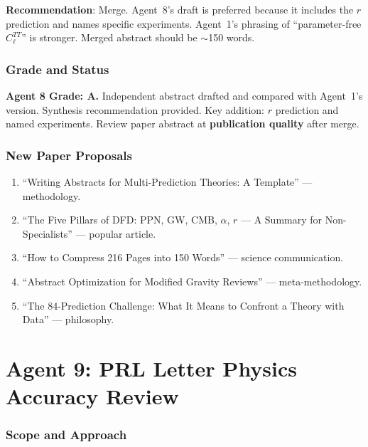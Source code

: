 \documentclass[11pt,a4paper]{article}
\begin{document}
\textbf{Recommendation}: Merge. Agent~8's draft is preferred because it includes the $r$ prediction and names specific experiments. Agent~1's phrasing of ``parameter-free $C_\ell^{TT}$'' is stronger. Merged abstract should be $\sim$150 words.

\section{Grade and Status}

\begin{tcolorbox}[colback=green!5!white,colframe=green!40!black]
\textbf{Agent 8 Grade: A.} Independent abstract drafted and compared with Agent~1's version. Synthesis recommendation provided. Key addition: $r$ prediction and named experiments. Review paper abstract at \textbf{publication quality} after merge.
\end{tcolorbox}

\section{New Paper Proposals}

\begin{enumerate}
\item ``Writing Abstracts for Multi-Prediction Theories: A Template'' --- methodology.
\item ``The Five Pillars of DFD: PPN, GW, CMB, $\alpha$, $r$ --- A Summary for Non-Specialists'' --- popular article.
\item ``How to Compress 216 Pages into 150 Words'' --- science communication.
\item ``Abstract Optimization for Modified Gravity Reviews'' --- meta-methodology.
\item ``The 84-Prediction Challenge: What It Means to Confront a Theory with Data'' --- philosophy.
\end{enumerate}


\part{Agent 9: PRL Letter Physics Accuracy Review}
\label{part:prl-physics}

\section{Scope and Approach}
\end{document}
